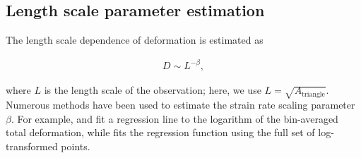 \documentclass[review, jog]{igs}
\begin{document}
\subsection{Length scale parameter estimation}
The length scale dependence of deformation is estimated as
\begin{linenomath*}
\begin{align}
    D \sim L^{-\beta},
\end{align}
\end{linenomath*}
where $L$ is the length scale of the observation; here, we use $L = \sqrt{A_{\text{triangle}}}$.
Numerous methods have been used to estimate the strain rate scaling parameter $\beta$.
For example, \cite{Marsan2004} and \cite{Hutchings2011} fit a regression line to the logarithm of the bin-averaged total deformation, while \cite{itkin2017_ThinIce} fits the regression function using the full set of log-transformed points.
\end{document}

